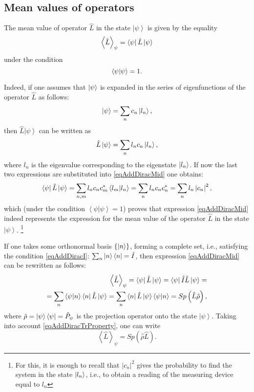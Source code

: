\subsection{Mean values of operators}
The mean value of operator $\hat{L}$ in the state $\left| \psi \right>$ is given by the equality 
\begin{equation}  
\left< \hat{L} \right>_{\psi} = \bra{\psi}\hat{L}\ket{\psi}
\label{eqAddDiracMid}
\end{equation}  
under the condition
\[
\bra{\psi}\ket{\psi} = 1.
\]

Indeed, if one assumes that $\ket{\psi}$ is expanded in the series of eigenfunctions of the operator $\hat{L}$ as follows:
\[
\ket{\psi} = \sum_n c_n \ket{l_n},
\]
then $\hat{L}\left|\psi\right>$ can be written as
\[
\hat{L}\ket{\psi} = \sum_n l_n c_n \ket{l_n},
\]
where $l_n$ is the eigenvalue corresponding to the eigenstate 
$\ket{l_n}$. 
If now the last two expressions are substituted into \eqref{eqAddDiracMid}
one obtains:
\[
\bra{\psi}\hat{L}\ket{\psi} = \sum_{n,m} 
l_n c_n c_m^{*} \bra{l_m}\ket{l_n}=
\sum_n l_n c_n c_n^{*} = 
\sum_n l_n \left|c_n\right|^2, 
\]
which (under the condition $\left<\psi\right.\left|\psi\right> = 1$) proves
that expression \eqref{eqAddDiracMid} indeed 
represents the expression for the mean value of the operator 
$\hat{L}$   in the state $\left|\psi\right>$.
\footnote{For this, it is enough to recall that $\left|c_n\right|^2$
  gives the probability to find the system in the state $\ket{l_n}$,
  i.e., to obtain a reading of the measuring device equal to $l_n$}

If one takes some orthonormal basis $\{\ket{ n }\}$,
forming a complete set, i.e., satisfying the condition
\eqref{eqAddDiracI}: $\sum_n \ket{ n }\bra{ n } =
\hat{I}$, then expression \eqref{eqAddDiracMid}
can be rewritten as follows:
\begin{eqnarray}
\left< \hat{L} \right>_{\psi} = 
\bra{\psi}\hat{L}\ket{\psi} = 
\bra{\psi}\hat{I}\hat{L}\ket{\psi} = 
\nonumber \\
= 
\sum_n \bra{\psi}\ket{n}\bra{n}
\hat{L}\ket{\psi} = 
\sum_n \bra{n}
\hat{L}\ket{\psi}\bra{\psi}\ket{n} = 
Sp \left(\hat{L} \hat{\rho} \right),
\nonumber
\end{eqnarray}
where 
\(
\hat{\rho} = \ket{\psi}\bra{\psi} = \hat{P}_{\psi}
\) is the projection operator onto the state 
$\left| \psi \right>$.
Taking into account \eqref{eqAddDiracTrProperty}, one can write
\begin{equation}
\left< \hat{L} \right>_{\psi} = Sp \left(\hat{\rho} \hat{L} \right).
\label{eqAddDiracMidViaRho}
\end{equation}

